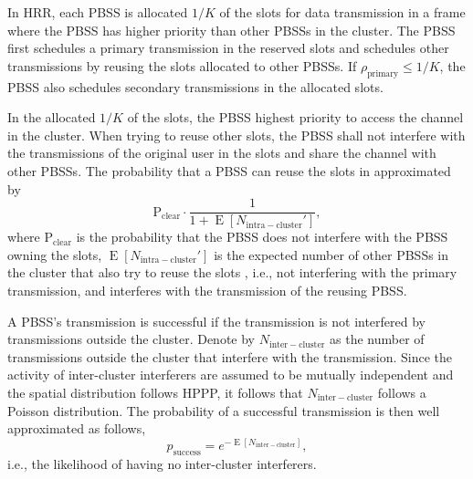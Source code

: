 \documentclass[10pt, conference, letterpaper]{IEEEtran}
\DeclareMathOperator*{\E}{\mathrm{E}}
\begin{document}
In HRR, each PBSS is allocated $1/K$ of the slots for data transmission in a frame where the PBSS has higher priority than other PBSSs in the cluster. 
The PBSS first schedules a primary transmission in the reserved slots and schedules other transmissions by reusing the slots allocated to other PBSSs. 
If $\rho_{\mathrm{primary}}\leq 1/K$, the PBSS also schedules secondary transmissions in the allocated slots. 

In the allocated $1/K$ of the slots, the PBSS highest priority to access the channel in the cluster. 
When trying to reuse other slots, the PBSS shall not interfere with the transmissions of the original user in the slots and share the channel with other PBSSs.
The probability that a PBSS can reuse the slots in approximated by
\begin{equation*}
\mathrm{P}_{\mathrm{clear}}\cdot \frac{1}{1+\E[N_{\mathrm{intra-cluster}}']},
\end{equation*}
where $\mathrm{P}_{\mathrm{clear}}$ is the probability that the PBSS does not interfere with the PBSS owning the slots, $\E[N_{\mathrm{intra-cluster}}']$ is the expected number of other PBSSs in the cluster that also try to reuse the slots , i.e., not interfering with the primary transmission, and interferes with the transmission of the reusing PBSS.


A PBSS's transmission is successful if the transmission is not interfered by transmissions outside the cluster. 
Denote by $N_{\mathrm{inter-cluster}}$ as the number of transmissions outside the cluster that interfere with the transmission. Since the activity of inter-cluster interferers are assumed to be mutually independent and the spatial distribution follows HPPP, it follows that $N_{\mathrm{inter-cluster}}$ follows a Poisson distribution. 
The probability of a successful transmission is then well approximated as follows, 
\begin{equation*}
p_{\mathrm{success}} = e^{-\E[N_{\mathrm{inter-cluster}}]},
\end{equation*} 
i.e., the likelihood of having no inter-cluster interferers.
\end{document}
